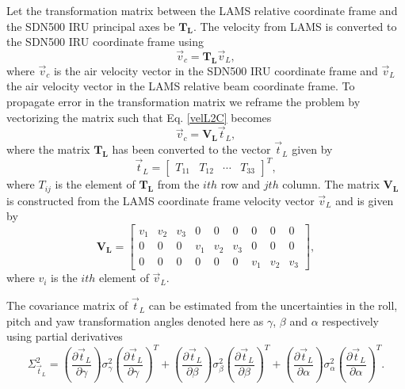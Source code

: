 \documentclass[12pt,twoside,english]{article}\usepackage[]{graphicx}\usepackage[]{color}
\begin{document}
{{Let the transformation matrix between the LAMS relative coordinate frame and the SDN500 IRU principal axes be $\mathbf{T_{L}}$. The velocity from LAMS is converted to the SDN500 IRU coordinate frame using  
\begin{equation}
\vec{v}_{c}=\mathbf{T_{L}}\vec{v}_{L},\label{velL2C}
\end{equation}
where $\vec{v}_{c}$ is the air velocity vector in the SDN500 IRU coordinate frame and $\vec{v}_{L}$ the air velocity vector in the LAMS relative beam coordinate frame. To propagate error in the transformation matrix we reframe the problem by vectorizing the matrix such that Eq. \eqref{velL2C} becomes  
\begin{equation}
\vec{v}_{c}=\mathbf{V_{L}}\vec{t}_{L},\label{velL2Cvect}
\end{equation}
where the matrix $\mathbf{T_{L}}$ has been converted to the vector $\vec{t}_{L}$ given by  
\begin{equation}
\vec{t}_{L}=\left[\begin{array}{cccc} T_{11} & T_{12} & \cdots & T_{33}\end{array}\right]^{T},\label{T2vec}
\end{equation}
where $T_{ij}$ is the element of $\mathbf{T_{L}}$ from the $ith$ row and $jth$ column. The matrix $\mathbf{V_{L}}$ is constructed from the LAMS coordinate frame velocity vector $\vec{v}_{L}$ and is given by  
\begin{equation}
\mathbf{V_{L}}=\left[\begin{array}{ccccccccc}
v_{1} & v_{2} & v_{3} & 0 & 0 & 0 & 0 & 0 & 0\\ 0 & 0 & 0 & v_{1} & v_{2} & v_{3} & 0 & 0 & 0\\ 0 & 0 & 0 & 0 & 0 & 0 & v_{1} & v_{2} & v_{3} 
\end{array}\right],\label{v2mat}
\end{equation}
where $v_{i}$ is the $ith$ element of $\vec{v}_{L}$. 

The covariance matrix of $\vec{t}_{L}$ can be estimated from the uncertainties in the roll, pitch and yaw transformation angles denoted here as $\gamma$, $\beta$ and $\alpha$ respectively using partial derivatives  
\begin{equation}
\Sigma_{\vec{t}_{L}}^{2}=\left(\frac{\partial\vec{t}_{L}}{\partial\gamma}\right)\sigma_{\gamma}^{2}\left(\frac{\partial\vec{t}_{L}}{\partial\gamma}\right)^{T}+\left(\frac{\partial\vec{t}_{L}}{\partial\beta}\right)\sigma_{\beta}^{2}\left(\frac{\partial\vec{t}_{L}}{\partial\beta}\right)^{T}+\left(\frac{\partial\vec{t}_{L}}{\partial\alpha}\right)\sigma_{\alpha}^{2}\left(\frac{\partial\vec{t}_{L}}{\partial\alpha}\right)^{T}.\label{tCov} 
\end{equation}

}}
\end{document}
